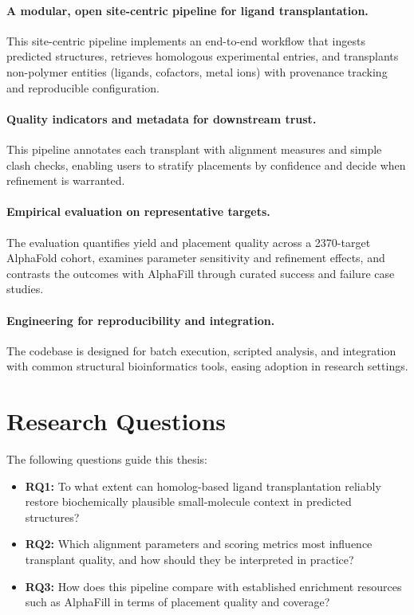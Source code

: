 \paragraph{A modular, open site-centric pipeline for ligand transplantation.} This site-centric pipeline implements an end-to-end workflow that ingests predicted structures, retrieves homologous experimental entries, and transplants non-polymer entities (ligands, cofactors, metal ions) with provenance tracking and reproducible configuration.
\paragraph{Quality indicators and metadata for downstream trust.} This pipeline annotates each transplant with alignment measures and simple clash checks, enabling users to stratify placements by confidence and decide when refinement is warranted.
\paragraph{Empirical evaluation on representative targets.} The evaluation quantifies yield and placement quality across a \num{2370}-target AlphaFold cohort, examines parameter sensitivity and refinement effects, and contrasts the outcomes with AlphaFill through curated success and failure case studies.
\paragraph{Engineering for reproducibility and integration.} The codebase is designed for batch execution, scripted analysis, and integration with common structural bioinformatics tools, easing adoption in research settings.

\section{Research Questions}
The following questions guide this thesis:
\begin{itemize}
    \item \textbf{RQ1:} To what extent can homolog-based ligand transplantation reliably restore biochemically plausible small-molecule context in predicted structures?
    \item \textbf{RQ2:} Which alignment parameters and scoring metrics most influence transplant quality, and how should they be interpreted in practice?
    \item \textbf{RQ3:} How does this pipeline compare with established enrichment resources such as AlphaFill in terms of placement quality and coverage?
\end{itemize}

